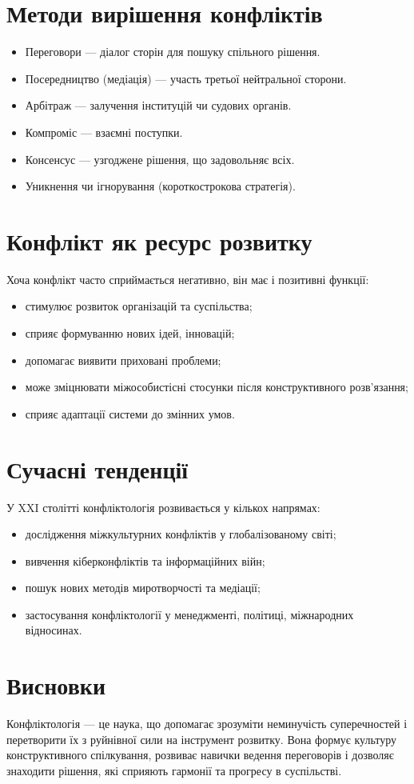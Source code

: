 \documentclass[12pt,a4paper]{article}
\begin{document}
    \section*{Методи вирішення конфліктів}
    \begin{itemize}
        \item Переговори — діалог сторін для пошуку спільного рішення.
        \item Посередництво (медіація) — участь третьої нейтральної сторони.
        \item Арбітраж — залучення інституцій чи судових органів.
        \item Компроміс — взаємні поступки.
        \item Консенсус — узгоджене рішення, що задовольняє всіх.
        \item Уникнення чи ігнорування (короткострокова стратегія).
    \end{itemize}

    \section*{Конфлікт як ресурс розвитку}
    Хоча конфлікт часто сприймається негативно, він має і позитивні функції:
    \begin{itemize}
        \item стимулює розвиток організацій та суспільства;
        \item сприяє формуванню нових ідей, інновацій;
        \item допомагає виявити приховані проблеми;
        \item може зміцнювати міжособистісні стосунки після конструктивного розв’язання;
        \item сприяє адаптації системи до змінних умов.
    \end{itemize}

    \section*{Сучасні тенденції}
    У XXI столітті конфліктологія розвивається у кількох напрямах:
    \begin{itemize}
        \item дослідження міжкультурних конфліктів у глобалізованому світі;
        \item вивчення кіберконфліктів та інформаційних війн;
        \item пошук нових методів миротворчості та медіації;
        \item застосування конфліктології у менеджменті, політиці, міжнародних відносинах.
    \end{itemize}

    \section*{Висновки}
    Конфліктологія — це наука, що допомагає зрозуміти неминучість суперечностей 
    і перетворити їх з руйнівної сили на інструмент розвитку. 
    Вона формує культуру конструктивного спілкування, 
    розвиває навички ведення переговорів і дозволяє знаходити рішення, 
    які сприяють гармонії та прогресу в суспільстві.
\end{document}
